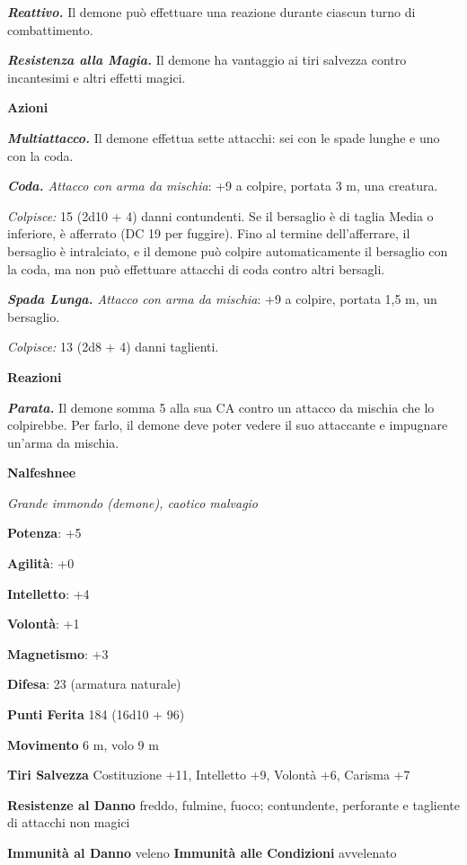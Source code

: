 \begin{multicols}{2}
\emph{\textbf{Reattivo.}} Il demone può effettuare una reazione durante
ciascun turno di combattimento.

\emph{\textbf{Resistenza alla Magia.}} Il demone ha vantaggio ai tiri
salvezza contro incantesimi e altri effetti magici.

\textbf{Azioni}

\emph{\textbf{Multiattacco.}} Il demone effettua sette attacchi: sei con
le spade lunghe e uno con la coda.

\emph{\textbf{Coda.} Attacco con arma da mischia}: +9 a colpire, portata
3 m, una creatura.

\emph{Colpisce:} 15 (2d10 + 4) danni contundenti. Se il bersaglio è di
taglia Media o inferiore, è afferrato (DC 19 per fuggire). Fino al
termine dell'afferrare, il bersaglio è intralciato, e il demone può
colpire automaticamente il bersaglio con la coda, ma non può effettuare
attacchi di coda contro altri bersagli.

\emph{\textbf{Spada Lunga.} Attacco con arma da mischia}: +9 a colpire,
portata 1,5 m, un bersaglio.

\emph{Colpisce:} 13 (2d8 + 4) danni taglienti.

\textbf{Reazioni}

\emph{\textbf{Parata.}} Il demone somma 5 alla sua CA contro un attacco
da mischia che lo colpirebbe. Per farlo, il demone deve poter vedere il
suo attaccante e impugnare un'arma da mischia.

\textbf{Nalfeshnee}

\emph{Grande immondo (demone), caotico malvagio}

\textbf{Potenza}: +5

\textbf{Agilità}: +0

\textbf{Intelletto}: +4

\textbf{Volontà}: +1

\textbf{Magnetismo}: +3

\textbf{Difesa}: 23 (armatura naturale)

\textbf{Punti Ferita} 184 (16d10 + 96)

\textbf{Movimento} 6 m, volo 9 m

\textbf{Tiri Salvezza} Costituzione +11, Intelletto +9, Volontà +6,
Carisma +7

\textbf{Resistenze al Danno} freddo, fulmine, fuoco; contundente,
perforante e tagliente di attacchi non magici

\textbf{Immunità al Danno} veleno \textbf{Immunità alle Condizioni}
avvelenato


\end{multicols}
